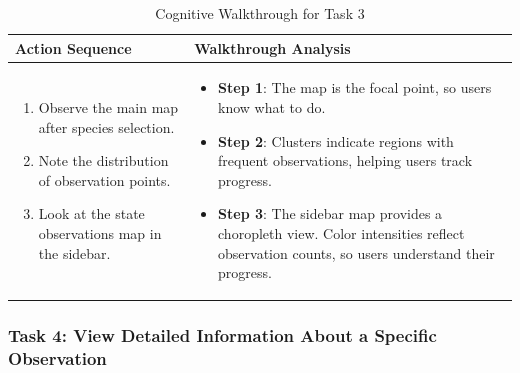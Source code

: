 \begin{table}[H]
    \centering
    \begin{tabular}{p{} | p{}}
        \hline
        \textbf{Action Sequence} & \textbf{Walkthrough Analysis} \\
        \hline
        \begin{enumerate}
            \item Observe the main map after species selection.
            \item Note the distribution of observation points.
            \item Look at the state observations map in the sidebar.
        \end{enumerate} &
        \begin{itemize}
            \item \textbf{Step 1}: The map is the focal point, so users know what to do.
            \item \textbf{Step 2}: Clusters indicate regions with frequent observations, helping users track progress.
            \item \textbf{Step 3}: The sidebar map provides a choropleth view. Color intensities reflect observation counts, so users understand their progress.
        \end{itemize} \\
        \hline
    \end{tabular}
    \caption{Cognitive Walkthrough for Task 3}
    \label{tab:task3_walkthrough}
\end{table}

\subsubsection{Task 4: View Detailed Information About a Specific Observation}

